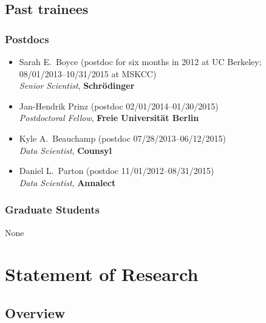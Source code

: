 \documentclass[10pt]{article}
\renewcommand{\baselinestretch}{1.1}
\begin{document}
\eject

\subsection*{Past trainees}

\subsubsection*{Postdocs}

\begin{itemize}
  \item Sarah E.~Boyce (postdoc for six months in 2012 at UC Berkeley;\\
  08/01/2013--10/31/2015 at MSKCC)\\
  \emph{Senior Scientist},  {\bf Schr\"{o}dinger}
  
  \item Jan-Hendrik Prinz (postdoc 02/01/2014--01/30/2015)\\
  \emph{Postdoctoral Fellow}, {\bf Freie Universit\"{a}t Berlin}
  
  \item Kyle A.~Beauchamp (postdoc 07/28/2013--06/12/2015)\\
  \emph{Data Scientist}, {\bf Counsyl}
  
  \item Daniel L.~Parton (postdoc 11/01/2012--08/31/2015)\\
  \emph{Data Scientist}, {\bf Annalect}
  
\end{itemize}

\subsubsection*{Graduate Students}

None

\eject


\renewcommand{\baselinestretch}{1.0}
\setlength{\parskip}{0.25em}

\section*{Statement of Research}

\subsection*{Overview}
\end{document}
